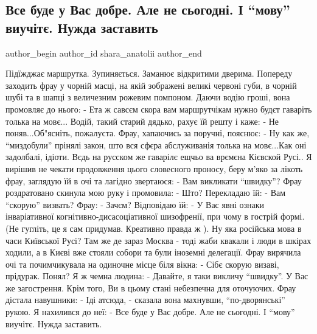  
 
 
 
 
 
\subsection{Все буде у Вас добре. Але не сьогодні. І \enquote{мову} виучітє. Нужда заставить}
\label{sec:03_12_2020.fb.shara_anatolii.1.movu_vyuchite}
\ifcmt
	author_begin
   author_id shara_anatolii
	author_end
\fi

\obeycr
Підїжджає маршрутка. Зупиняється. Заманює відкритими дверима. Попереду заходить фрау у чорній масці, на якій зображені великі червоні губи, в чорній шубі та в шапці з величезним рожевим помпоном. 
Даючи водію гроші, вона промовляє до нього: 
- Ета ж савсєм скора вам маршрутчікам нужно будєт гаваріть толька на мовє...
Водій, такий старий дядько, рахує їй решту і каже: 
 - Не поняв...Об"ясніть, пожалуста. 
Фрау, хапаючись за поручні, пояснює: 
- Ну как же, \enquote{миздобули} прінялі закон, што вся сфєра абслуживанія толька на мовє...Как оні задолбалі, ідіоти. Вєдь на русском же гаварілє ещчьо ва врємєна Кієвской Русі..
Я вирішив не чекати продовження цього словесного проносу, беру м'яко за лікоть фрау, заглядую їй в очі та лагідно звертаюся: 
- Вам викликати \enquote{швидку}? 
Фрау роздратовано скинула мою руку і промовила: 
- Што? 
Перекладаю їй: 
 - Вам \enquote{скорую} визвать? 
Фрау: 
- Зачєм? 
Відповідаю їй:
- У Вас явні ознаки інваріативної когнітивно-дисасоціативної шизофренії, при чому в гострій формі. (Не гугліть, це я сам придумав. Креативно правда ж  ). 
Ну яка російська мова в часи Київської Русі? Там же де зараз Москва - тоді жаби квакали і люди в шкірах ходили, а в Києві вже стояли собори та були іноземні делегації. 
Фрау вирячила очі та почимчикувала на одиночне місце біля вікна:  
- Сібє скорую визаві, прідурак. Понял? 
Я ж чемна людина: 
- Давайте, я таки викличу \enquote{швидку}. У Вас же загострення. Крім того, Ви в цьому стані небезпечна для оточуючих. 
Фрау дістала навушники: 
- Іді атсюда, - сказала вона махнувши, \enquote{по-дворянські} рукою. 
Я нахилився до неї:
- Все буде у Вас добре. Але не сьогодні. І \enquote{мову} виучітє. Нужда заставить.
\restorecr

